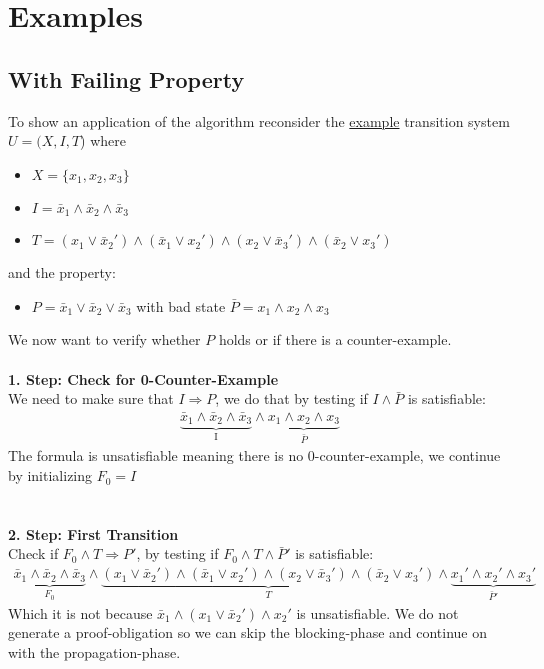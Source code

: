 \documentclass[11pt, a4paper, BCOR=10mm, ngerman, oneside]{scrbook}
\begin{document}
\section{Examples}
 
\subsection{With Failing Property} 
To show an application of the algorithm reconsider the \hyperref[ex1]{example} transition system $U = (X, I, T$) where \\
\begin{itemize}
\item $X = \{x_1, x_2, x_3\}$
\item $I = \bar x_1 \land \bar x_2 \land \bar x_3$
\item $T = (x_1 \lor \bar x_2' ) \land ( \bar x_1 \lor x_2') \land (x_2 \lor \bar x_3') \land ( \bar x_2 \lor x_3')$
\end{itemize}
and the property: 
\begin{itemize}
\item $P = \bar x_1 \lor \bar x_2 \lor \bar x_3$ with bad state $\bar P = x_1 \land x_2 \land x_3$ 
\end{itemize}
We now want to verify whether $P$ holds or if there is a counter-example. \\ \\

\textbf{1. Step: Check for 0-Counter-Example} \\ We need to make sure that $ I \Rightarrow P$, we do that by testing if $I \land \bar P$ is satisfiable:
\begin{align*}
\underbrace{\bar x_1 \land \bar x_2 \land \bar x_3}_{\text{I}} \land \underbrace{x_1 \land x_2 \land x_3}_{ \bar P}
\end{align*}
The formula is unsatisfiable meaning there is no 0-counter-example, we continue by initializing $F_0 = I$ \\ \\  \\

\textbf{2. Step: First Transition}\\
Check if $F_0 \land T \Rightarrow P'$, by testing if $F_0 \land T \land \bar P'$ is satisfiable: 
\begin{align*}
\underbrace{\bar x_1 \land \bar x_2 \land \bar x_3}_{F_0} \land \underbrace{(x_1 \lor \bar x_2' ) \land ( \bar x_1 \lor x_2') \land (x_2 \lor \bar x_3') \land ( \bar x_2 \lor x_3')}_{T} \land \underbrace{ x_1' \land x_2' \land x_3'}_{\bar P'}
\end{align*}
Which it is not because $\bar x_1 \land (x_1 \lor \bar x_2') \land x_2'$ is unsatisfiable. We do not generate a proof-obligation so we can skip the blocking-phase and continue on with the propagation-phase. \\ \\ \\
\end{document}
